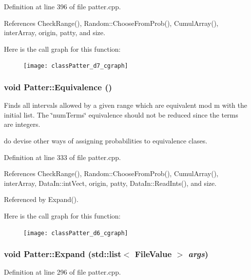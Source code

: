 Definition at line 396 of file patter.cpp.

References Check\-Range(), Random::Choose\-From\-Prob(), Cumul\-Array(), inter\-Array, origin, patty, and size.

Here is the call graph for this function:\begin{figure}[H]
\begin{center}
\leavevmode
\texttt{[image: classPatter\_d7\_cgraph]}
\end{center}
\end{figure}
\subsubsection{\setlength{\rightskip}{0pt plus 5cm}void Patter::Equivalence ()\hspace{0.3cm}{\tt  [private]}}\label{classPatter_d6}


Finds all intervals allowed by a given range which are equivalent mod m with the initial list. The \char`\"{}num\-Terms\char`\"{} equivalence should not be reduced since the terms are integers.

do devise other ways of assigning probabilities to equivalence clases. 

Definition at line 333 of file patter.cpp.

References Check\-Range(), Random::Choose\-From\-Prob(), Cumul\-Array(), inter\-Array, Data\-In::int\-Vect, origin, patty, Data\-In::Read\-Ints(), and size.

Referenced by Expand().

Here is the call graph for this function:\begin{figure}[H]
\begin{center}
\leavevmode
\texttt{[image: classPatter\_d6\_cgraph]}
\end{center}
\end{figure}
\subsubsection{\setlength{\rightskip}{0pt plus 5cm}void Patter::Expand (std::list$<$ {\bf File\-Value} $>$ {\em args})\hspace{0.3cm}{\tt  [private]}}\label{classPatter_d5}




Definition at line 296 of file patter.cpp.

